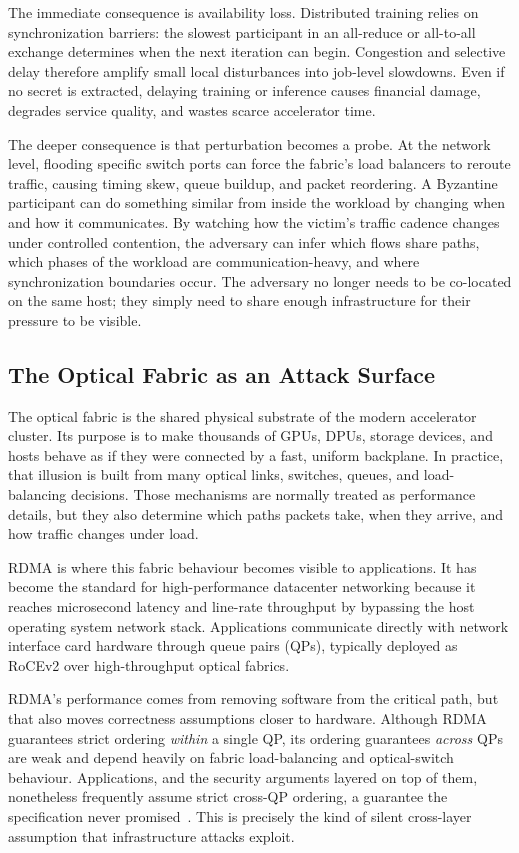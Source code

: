 The immediate consequence is availability loss. Distributed training relies on synchronization barriers: the slowest participant in an all-reduce or all-to-all exchange determines when the next iteration can begin. Congestion and selective delay therefore amplify small local disturbances into job-level slowdowns. Even if no secret is extracted, delaying training or inference causes financial damage, degrades service quality, and wastes scarce accelerator time.

The deeper consequence is that perturbation becomes a probe. At the network level, flooding specific switch ports can force the fabric's load balancers to reroute traffic, causing timing skew, queue buildup, and packet reordering. A Byzantine participant can do something similar from inside the workload by changing when and how it communicates. By watching how the victim's traffic cadence changes under controlled contention, the adversary can infer which flows share paths, which phases of the workload are communication-heavy, and where synchronization boundaries occur. The adversary no longer needs to be co-located on the same host; they simply need to share enough infrastructure for their pressure to be visible.

\subsection{The Optical Fabric as an Attack Surface}
\label{sec:fabric-attack-surface}

The optical fabric is the shared physical substrate of the modern accelerator cluster. Its purpose is to make thousands of GPUs, DPUs, storage devices, and hosts behave as if they were connected by a fast, uniform backplane. In practice, that illusion is built from many optical links, switches, queues, and load-balancing decisions. Those mechanisms are normally treated as performance details, but they also determine which paths packets take, when they arrive, and how traffic changes under load.

RDMA is where this fabric behaviour becomes visible to applications. It has become the standard for high-performance datacenter networking because it reaches microsecond latency and line-rate throughput by bypassing the host operating system network stack. Applications communicate directly with network interface card hardware through queue pairs (QPs), typically deployed as RoCEv2 over high-throughput optical fabrics.

RDMA's performance comes from removing software from the critical path, but that also moves correctness assumptions closer to hardware. Although RDMA guarantees strict ordering \emph{within} a single QP, its ordering guarantees \emph{across} QPs are weak and depend heavily on fabric load-balancing and optical-switch behaviour. Applications, and the security arguments layered on top of them, nonetheless frequently assume strict cross-QP ordering, a guarantee the specification never promised~\cite{rfc5040, ibta_rocev2}. This is precisely the kind of silent cross-layer assumption that infrastructure attacks exploit.

